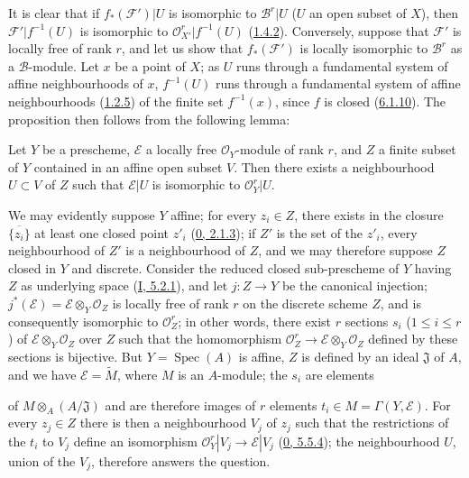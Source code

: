It is clear that if $f_*(\mathcal{F}')|U$ is isomorphic to
$\mathcal{B}^r|U$ ($U$ an open subset of $X$), then $\mathcal{F}'|f^{-1}(U)$
is isomorphic to $\mathcal{O}_{X'}^r|f^{-1}(U)$
(\hyperref[II.1.4.2]{1.4.2}). Conversely, suppose that $\mathcal{F}'$ is
locally free of rank $r$, and let us show that $f_*(\mathcal{F}')$ is locally
isomorphic to $\mathcal{B}^r$ as a $\mathcal{B}$-module. Let $x$ be a point
of $X$; as $U$ runs through a fundamental system of affine neighbourhoods of
$x$, $f^{-1}(U)$ runs through a fundamental system of affine neighbourhoods
(\hyperref[II.1.2.5]{1.2.5}) of the finite set $f^{-1}(x)$, since $f$ is
closed (\hyperref[II.6.1.10]{6.1.10}). The proposition then follows from
the following lemma:

\begin{lemma}[6.1.12.1]
\label{II.6.1.12.1}
Let $Y$ be a prescheme, $\mathcal{E}$ a locally free $\mathcal{O}_Y$-module
of rank $r$, and $Z$ a finite subset of $Y$ contained in an affine open
subset $V$. Then there exists a neighbourhood $U\subset V$ of $Z$ such that
$\mathcal{E}|U$ is isomorphic to $\mathcal{O}_Y^r|U$.
\end{lemma}

We may evidently suppose $Y$ affine; for every $z_i\in Z$, there exists in
the closure $\overline{\{z_i\}}$ at least one closed point $z'_i$
(\hyperref[0.2.1.3]{0, 2.1.3}); if $Z'$ is the set of the $z'_i$, every
neighbourhood of $Z'$ is a neighbourhood of $Z$, and we may therefore suppose
$Z$ closed in $Y$ and discrete. Consider the reduced closed sub-prescheme of
$Y$ having $Z$ as underlying space (\hyperref[I.5.2.1]{I, 5.2.1}), and let
$j:Z\to Y$ be the canonical injection; $j^*(\mathcal{E})=\mathcal{E}\otimes_Y
\mathcal{O}_Z$ is locally free of rank $r$ on the discrete scheme $Z$, and is
consequently isomorphic to $\mathcal{O}_Z^r$; in other words, there exist $r$
sections $s_i$ ($1\leq i\leq r$) of $\mathcal{E}\otimes_Y\mathcal{O}_Z$
over $Z$ such that the homomorphism
$\mathcal{O}_Z^r\to\mathcal{E}\otimes_Y\mathcal{O}_Z$ defined by these
sections is bijective. But $Y=\operatorname{Spec}(A)$ is affine, $Z$ is
defined by an ideal $\mathfrak{J}$ of $A$, and we have
$\mathcal{E}=\widetilde{M}$, where $M$ is an $A$-module; the $s_i$ are
elements


of $M\otimes_A(A/\mathfrak{J})$ and are therefore images of $r$ elements
$t_i\in M=\Gamma(Y,\mathcal{E})$. For every $z_j\in Z$ there is then a
neighbourhood $V_j$ of $z_j$ such that the restrictions of the $t_i$ to $V_j$
define an isomorphism
$\mathcal{O}_Y^r|V_j\to\mathcal{E}|V_j$
(\hyperref[0.5.5.4]{0, 5.5.4}); the neighbourhood $U$, union of the
$V_j$, therefore answers the question.

